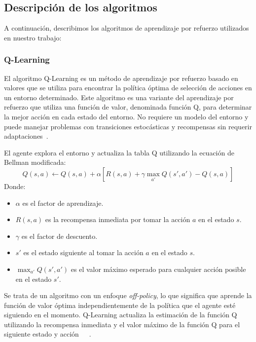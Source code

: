 \documentclass[conference,a4paper]{IEEEtran}
\begin{document}
\subsection{Descripción de los algoritmos}

A continuación, describimos los algoritmos de aprendizaje por refuerzo utilizados en nuestro trabajo:\newline

\subsubsection{\textbf{Q-Learning}}
El algoritmo Q-Learning es un método de aprendizaje por refuerzo basado en valores que se utiliza para encontrar la política óptima de selección de acciones en un entorno determinado.
Este algoritmo es una variante del aprendizaje por refuerzo que utiliza una función de valor, denominada función Q, para determinar la mejor acción en cada estado del entorno.
No requiere un modelo del entorno y puede manejar problemas con transiciones estocásticas y recompensas sin requerir adaptaciones~\cite{b5}.

El agente explora el entorno y actualiza la tabla Q utilizando la ecuación de Bellman modificada:
\[
Q(s, a) \leftarrow Q(s, a) + \alpha [R(s, a) + \gamma \max_{a'} Q(s', a') - Q(s,a)]
\]
Donde:
\begin{itemize}
    \item \(\alpha\) es el factor de aprendizaje.
    \item \(R(s, a)\) es la recompensa inmediata por tomar la acción \(a\) en el estado \(s\).
    \item \(\gamma\) es el factor de descuento.
    \item \(s'\) es el estado siguiente al tomar la acción \(a\) en el estado \(s\).
    \item \(\max_{a'} Q(s', a')\) es el valor máximo esperado para cualquier acción posible en el estado \(s'\).\newline
\end{itemize}

Se trata de un algoritmo con un enfoque \textit{off-policy}, lo que significa que aprende la función de valor óptima independientemente de la política que el agente esté siguiendo en el momento. Q-Learning actualiza la estimación de la función Q utilizando la recompensa inmediata y el valor máximo de la función Q para el siguiente estado y acción~\cite{b1}~\cite{b4}~\cite{b5}.\newline
\end{document}
